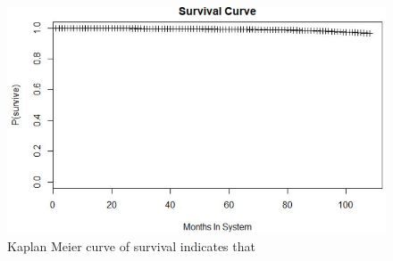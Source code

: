 \documentclass[twoside,10.5pt]{article}
\begin{document}
\begin{figure}[htp]
\centering
\includegraphics[width=12cm]{images/kaplan_meier.JPG}
\caption{Kaplan Meier curve of survival indicates that }
\label{fig:km_original}
\end{figure}

\newpage
\theendnotes


\end{document}
